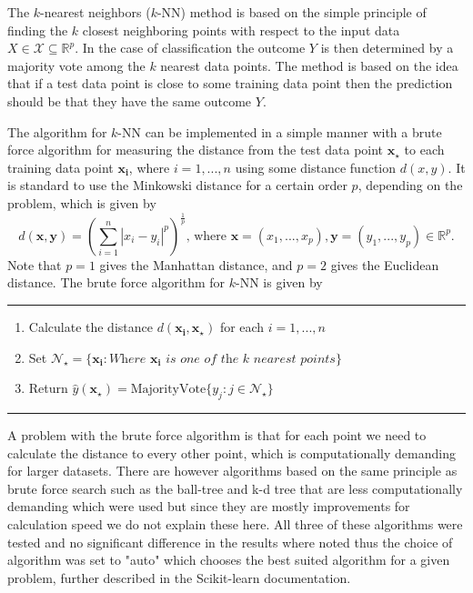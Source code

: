 \documentclass[../../project.tex]{subfiles}
\begin{document}
	The $k$-nearest neighbors ($k$-NN) method is based on the simple principle of finding the $k$ closest neighboring points with respect to the input data $X \in \mathcal{X} \subseteq \mathbb{R}^p$. In the case of classification the outcome $Y$ is then determined by a majority vote among the $k$ nearest data points. The method is based on the idea that if a test data point is close to some training data point then the prediction should be that they have the same outcome $Y$.
	
	The algorithm for $k$-NN can be implemented in a simple manner with a brute force algorithm for measuring the distance from the test data point $\boldsymbol{x_{\star}}$ to each training data point $\boldsymbol{x_{i}}$, where $i = 1,...,n$ using some distance function $d(x,y)$. It is standard to use the Minkowski distance for a certain order $p$, depending on the problem, which is given by
	\begin{equation}
	d(\boldsymbol{x},\boldsymbol{y}) = \left( \sum_{i=1}^{n} |x_{i} - y_{i}|^{p} \right)^{\frac{1}{p}}\text{, where } \boldsymbol{x} = (x_1,...,x_p),\boldsymbol{y}=(y_1,...,y_p)
	\in \mathbb{R}^p.
	\end{equation}
	Note that $p=1$ gives the Manhattan distance, and $p=2$ gives the Euclidean distance. The brute force algorithm for $k$-NN is given by\cite{Kursbok}
	\par\noindent\rule{\textwidth}{0.4pt}
	\begin{enumerate}
		\item Calculate the distance $d(\boldsymbol{x_{i}},\boldsymbol{x_{\star}})$ for each $i = 1,...,n$
		\item Set $\mathcal{N}_{\star} = \{ \boldsymbol{x_i}: \textit{Where } \boldsymbol{x_i} \textit{ is one of the k nearest points} \}$
		\item Return $\hat{y}(\boldsymbol{x_{\star}}) = \text{MajorityVote}\{y_j : j \in \mathcal{N}_{\star}\} $
	\end{enumerate}
	\par\noindent\rule{\textwidth}{0.4pt}
	
	
	A problem with the brute force algorithm is that for each point we need to calculate the distance to every other point, which is computationally demanding for larger datasets. There are however algorithms based on the same principle as brute force search such as the ball-tree and k-d tree that are less computationally demanding which were used but since they are mostly improvements for calculation speed we do not explain these here. All three of these algorithms were tested and no significant difference in the results where noted thus the choice of algorithm was set to "auto" which chooses the best suited algorithm for a given problem, further described in the Scikit-learn documentation. \cite{sklearn} 
	
\end{document}
